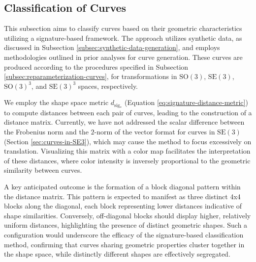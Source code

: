 \subsection{Classification of Curves}
\label{subsec:classification-curves-signature}

This subsection aims to classify curves based on their geometric characteristics utilizing a signature-based framework. The approach utilizes synthetic data, as discussed in Subsection \ref{subsec:synthetic-data-generation}, and employs methodologies outlined in prior analyses for curve generation. These curves are produced according to the procedures specified in Subsection \ref{subsec:reparameterization-curves}, for transformations in \(\mathrm{SO}(3)\), \(\mathrm{SE}(3)\), \(\mathrm{SO}(3)^3\), and \(\mathrm{SE}(3)^3\) spaces, respectively.

We employ the shape space metric \(d_{\text{sig}_*}\) (Equation \eqref{eq:signature-distance-metric}) to compute distances between each pair of curves, leading to the construction of a distance matrix. Currently, we have not addressed the scalar difference between the Frobenius norm and the \(2\)-norm of the vector format for curves in \(\mathrm{SE}(3)\) (Section \ref{sec:curves-in-SE3}), which may cause the method to focus excessively on translation. Visualizing this matrix with a color map facilitates the interpretation of these distances, where color intensity is inversely proportional to the geometric similarity between curves.

A key anticipated outcome is the formation of a block diagonal pattern within the distance matrix. This pattern is expected to manifest as three distinct 4x4 blocks along the diagonal, each block representing lower distances indicative of shape similarities. Conversely, off-diagonal blocks should display higher, relatively uniform distances, highlighting the presence of distinct geometric shapes. Such a configuration would underscore the efficacy of the signature-based classification method, confirming that curves sharing geometric properties cluster together in the shape space, while distinctly different shapes are effectively segregated.

